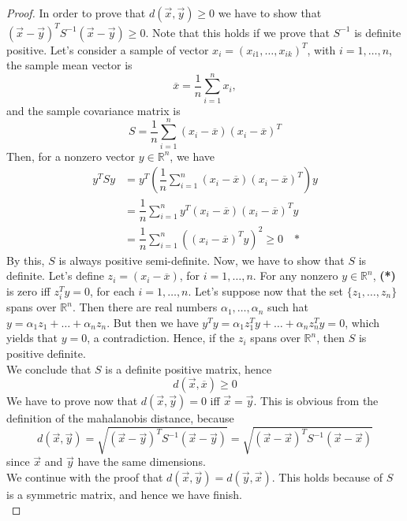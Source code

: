 \documentclass{article}
\theoremstyle{definition}
\theoremstyle{remark}
\theoremstyle{remark}
\theoremstyle{example}
\begin{document}
\begin{proof}
In order to prove that $d(\vec{x},\vec{y}) \geq 0$ we have to show that $(\vec{x} - \vec{y})^{T}S^{-1}(\vec{x}-\vec{y})\geq 0$. Note that this holds if we prove that $S^{-1}$ is definite positive. Let's consider a sample of vector $x_{i} = (x_{i1},\ldots,x_{ik})^{T}$, with $i = 1,\ldots,n$, the sample mean vector is
\[
\overline{x} = \dfrac{1}{n} \sum_{i = 1}^{n} x_{i},
\]
and the sample covariance matrix is
\[
S = \dfrac{1}{n} \sum_{i = 1}^{n} (x_{i} - \overline{x})(x_{i}- \overline{x})^{T}
\]
Then, for a nonzero vector $y \in \mathbb{R}^{n}$, we have
\begin{align*}
    y^{T}S y &= y^{T} \left ( \dfrac{1}{n} \sum_{i = 1}^{n} (x_{i} - \overline{x})(x_{i}- \overline{x})^{T} \right) y \\
    &= \dfrac{1}{n} \sum_{i = 1}^{n} y^{T} (x_{i} - \overline{x})(x_{i} - \overline{x})^{T} y \\
    &= \dfrac{1}{n} \sum_{i = 1}^{n} ((x_{i} - \overline{x})^{T}y)^{2} \geq 0 \quad \textbf{*}
\end{align*}
By this, $S$ is always positive semi-definite. Now, we have to show that $S$ is definite. Let's define $z_{i} = (x_{i} - \overline{x})$, for $i = 1,\ldots,n$. For any nonzero $y \in \mathbb{R}^{n}$, \textbf{(*)} is zero iff $z_{i}^{T}y = 0$, for each $i = 1,\ldots,n$. Let's suppose now that the set $\{z_{1},\ldots,z_{n}\}$ spans over $\mathbb{R}^{n}$. Then there are real numbers $\alpha_{1},\ldots,\alpha_{n}$ such hat $y = \alpha_{1}z_{1} + \ldots + \alpha_{n}z_{n}$. But then we have $y^{T}y = \alpha_{1}z_{1}^{T}y + \ldots + \alpha_{n}z_{n}^{T}y = 0$, which yields that $y = 0$, a contradiction. Hence, if the $z_{i}$ spans over $\mathbb{R}^{n}$, then $S$ is positive definite. \\
We conclude that $S$ is a definite positive matrix, hence
\[
d(\vec{x},\overline{x}) \geq 0
\]
We have to prove now that $d(\vec{x},\vec{y}) = 0$ iff  $\vec{x} = \vec{y}$. This is obvious from the definition of the mahalanobis distance, because
\[
d(\vec{x},\vec{y}) = \sqrt{(\vec{x} - \vec{y})^{T}S^{-1}(\vec{x}-\vec{y})} = \sqrt{(\vec{x} - \vec{x})^{T}S^{-1}(\vec{x}-\vec{x})}
\]
since $\vec{x}$ and $\vec{y}$ have the same dimensions. \\

We continue with the proof that $d(\vec{x},\vec{y}) = d(\vec{y},\vec{x})$. This holds because of $S$ is a symmetric matrix, and hence we have finish. \\


\end{proof}
\end{document}
